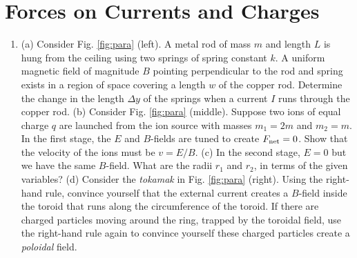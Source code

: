 \documentclass{article}
\begin{document}
\section{Forces on Currents and Charges}

\begin{enumerate}
\item (a) Consider Fig. \ref{fig:para} (left). A metal rod of mass $m$ and length $L$ is hung from the ceiling using two springs of spring constant $k$. A uniform magnetic field of magnitude $B$ pointing perpendicular to the rod and spring exists in a region of space covering a length $w$ of the copper rod.  Determine the change in the length $\Delta y$ of the springs when a current $I$ runs through the copper rod. (b) Consider Fig. \ref{fig:para} (middle). Suppose two ions of equal charge $q$ are launched from the ion source with masses $m_1 = 2 m$ and $m_2 = m$.  In the first stage, the $E$ and $B$-fields are tuned to create $F_{\rm net} = 0$.  Show that the velocity of the ions must be $v = E/B$. (c) In the second stage, $E = 0$ but we have the same $B$-field.  What are the radii $r_1$ and $r_2$, in terms of the given variables? (d) Consider the \textit{tokamak} in Fig. \ref{fig:para} (right).  Using the right-hand rule, convince yourself that the external current creates a $B$-field inside the toroid that runs along the circumference of the toroid.  If there are charged particles moving around the ring, trapped by the toroidal field, use the right-hand rule again to convince yourself these charged particles create a \textit{poloidal} field.
\end{enumerate}
\end{document}
